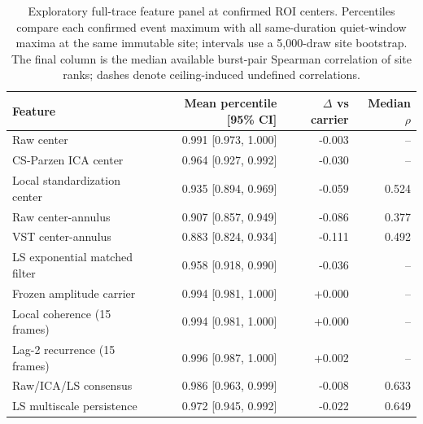 \begin{table}[!htbp]
\centering
\scriptsize
\begin{tabularx}{\linewidth}{X r r r}
\toprule
Feature & Mean percentile [95\% CI] & $\Delta$ vs carrier & Median $\rho$ \\
\midrule
Raw center & 0.991 [0.973, 1.000] & -0.003 & -- \\
CS-Parzen ICA center & 0.964 [0.927, 0.992] & -0.030 & -- \\
Local standardization center & 0.935 [0.894, 0.969] & -0.059 & 0.524 \\
Raw center-annulus & 0.907 [0.857, 0.949] & -0.086 & 0.377 \\
VST center-annulus & 0.883 [0.824, 0.934] & -0.111 & 0.492 \\
LS exponential matched filter & 0.958 [0.918, 0.990] & -0.036 & -- \\
Frozen amplitude carrier & 0.994 [0.981, 1.000] & +0.000 & -- \\
Local coherence (15 frames) & 0.994 [0.981, 1.000] & +0.000 & -- \\
Lag-2 recurrence (15 frames) & 0.996 [0.987, 1.000] & +0.002 & -- \\
Raw/ICA/LS consensus & 0.986 [0.963, 0.999] & -0.008 & 0.633 \\
LS multiscale persistence & 0.972 [0.945, 0.992] & -0.022 & 0.649 \\
\bottomrule
\end{tabularx}
\caption{Exploratory full-trace feature panel at confirmed ROI centers. Percentiles compare each confirmed event maximum with all same-duration quiet-window maxima at the same immutable site; intervals use a 5,000-draw site bootstrap. The final column is the median available burst-pair Spearman correlation of site ranks; dashes denote ceiling-induced undefined correlations.}
\label{tab:full-trace-feature-panel}
\end{table}
